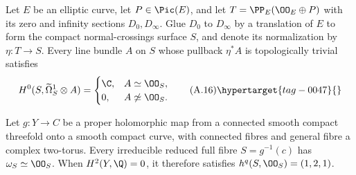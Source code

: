 \begin{proposition}\hypertarget{tag-01AS}{}\label{cdp:st:A.4.3}


Let $E$ be an elliptic curve, let $P\in\Pic(E)$, and let $T=\PP_E(\OO_E\oplus P)$ with its zero and infinity sections $D_0,D_\infty$. Glue $D_0$ to $D_\infty$ by a translation of $E$ to form the compact normal-crossings surface $S$, and denote its normalization by $\eta:T\to S$. Every line bundle $A$ on $S$ whose pullback $\eta^*A$ is topologically trivial satisfies
\[
H^0(S,\widetilde\Omega_S^1\otimes A)=
\begin{cases}\C,&A\simeq\OO_S,\\0,&A\not\simeq\OO_S.\end{cases}
\tag{A.16}\hypertarget{tag-0047}{}\label{cdp:eq:A.16}
\]
\end{proposition}

\begin{proposition}\hypertarget{tag-01AT}{}\label{cdp:st:A.4.4}


Let $g:Y\to C$ be a proper holomorphic map from a connected smooth compact threefold onto a smooth compact curve, with connected fibres and general fibre a complex two-torus. Every irreducible reduced full fibre $S=g^{-1}(c)$ has $\omega_S\simeq\OO_S$. When $H^2(Y,\Q)=0$, it therefore satisfies $h^q(S,\OO_S)=(1,2,1)$.
\end{proposition}

